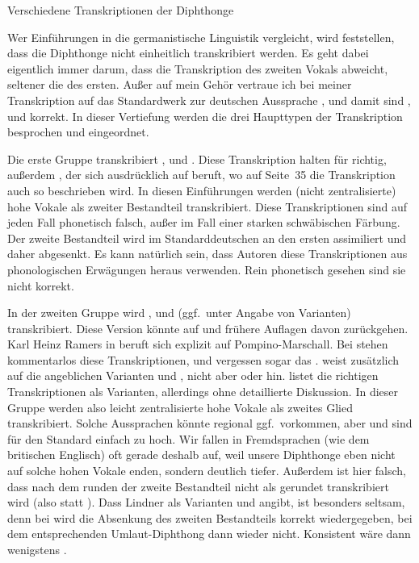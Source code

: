 \begin{Vertiefung}{Verschiedene Transkriptionen der Diphthonge}
\label{vert:diphthonge}

Wer Einführungen in die germanistische Linguistik vergleicht, wird feststellen, dass die Diphthonge nicht einheitlich transkribiert werden.
Es geht dabei eigentlich immer darum, dass die Transkription des zweiten Vokals abweicht, seltener die des ersten.
Außer auf mein Gehör vertraue ich bei meiner Transkription auf das Standardwerk zur deutschen Aussprache \citet{KrechEa2009}, und damit sind \textipa{[\t{aE}]}, \textipa{[\t{aO}]} und \textipa{[\t{O\oe}]} korrekt.
In dieser Vertiefung werden die drei Haupttypen der Transkription besprochen und eingeordnet.

Die erste Gruppe transkribiert \textipa{[\t{ai}]}, \textipa{[\t{au}]} und \textipa{[\t{Oy}]}.
Diese Transkription halten \citet[47]{BuschStenschke2014} für richtig, außerdem \citet[63]{Ernst2011}, der sich ausdrücklich auf \citet{Mangold2006} beruft, wo auf Seite~35 die Transkription auch so beschrieben wird.
In diesen Einführungen werden (nicht zentralisierte) hohe Vokale als zweiter Bestandteil transkribiert.
Diese Transkriptionen sind auf jeden Fall phonetisch falsch, außer im Fall einer starken schwäbischen Färbung.
Der zweite Bestandteil wird im Standarddeutschen an den ersten assimiliert und daher abgesenkt.
Es kann natürlich sein, dass Autoren diese Transkriptionen aus phonologischen Erwägungen heraus verwenden.
Rein phonetisch gesehen sind sie nicht korrekt.

In der zweiten Gruppe wird \textipa{[\t{aI}]}, \textipa{[\t{AU}]} und \textipa{[\t{OI}]} (ggf.\ unter Angabe von Varianten) transkribiert.
Diese Version könnte auf \citet{Pompinomarschall2009} und frühere Auflagen davon zurückgehen.
Karl Heinz Ramers in \citet[81]{MeibauerEa2015} beruft sich explizit auf Pompino-Marschall.
Bei \citet[28]{FuhrhopPeters2013} stehen kommentarlos diese Transkriptionen, und \citet[184]{KesselReimann2010} vergessen sogar das \textipa{[\t{OI}]}.
\citet{Lindner2014} weist zusätzlich auf die angeblichen Varianten \textipa{[\t{ao}]} und \textipa{[\t{oY}]}, nicht aber \textipa{[\t{ae}]} oder \textipa{[\t{aE}]} hin.
\citet[74]{Pelz1996} listet die richtigen Transkriptionen als Varianten, allerdings ohne detaillierte Diskussion.
In dieser Gruppe werden also leicht zentralisierte hohe Vokale als zweites Glied transkribiert.
Solche Aussprachen könnte regional ggf.\ vorkommen, aber \textipa{[I]} und \textipa{[U]} sind für den Standard einfach zu hoch.
Wir fallen in Fremdsprachen (wie dem britischen Englisch) oft gerade deshalb auf, weil unsere Diphthonge eben nicht auf solche hohen Vokale enden, sondern deutlich tiefer.
Außerdem ist hier falsch, dass nach dem runden \textipa{[O]} der zweite Bestandteil nicht als gerundet transkribiert wird (also \textipa{[I]} statt \textipa{[Y]}).
Dass Lindner als Varianten \textipa{[\t{ao}]} und \textipa{[\t{oY}]} angibt, ist besonders seltsam, denn bei \textipa{[\t{ao}]} wird die Absenkung des zweiten Bestandteils korrekt wiedergegeben, bei dem entsprechenden Umlaut-Diphthong \textipa{[\t{oY}]} dann wieder nicht.
Konsistent wäre dann wenigstens \textipa{[\t{o\o}]}.


\end{Vertiefung}
